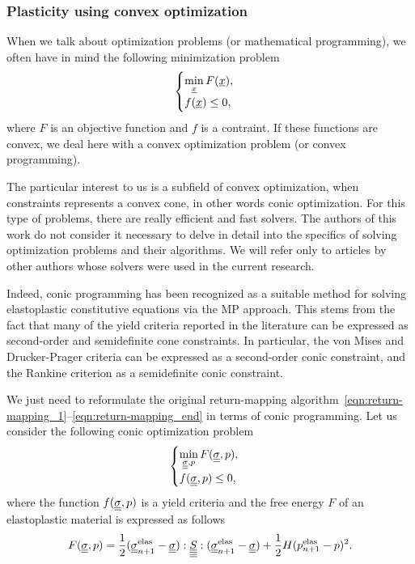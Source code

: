 \documentclass[12pt]{article}
\begin{document}
\subsubsection{Plasticity using convex optimization}

When we talk about optimization problems (or mathematical programming), we often have in mind the following minimization problem
\begin{equation}
    \begin{cases}
        \min\limits_{\underline{x}} F(\underline{x}),\\
        f(\underline{x}) \leq 0,
    \end{cases}
\end{equation}
where $F$ is an objective function and $f$ is a contraint. If these functions are convex, we deal here with a convex optimization problem (or convex programming). 

The particular interest to us is a subfield of convex optimization, when constraints represents a convex cone, in other words conic optimization. For this type of problems, there are really efficient and fast solvers. The authors of this work do not consider it necessary to delve in detail into the specifics of solving optimization problems and their algorithms. We will refer only to articles by other authors whose solvers were used in the current research.

Indeed, conic programming has been recognized as a suitable method for solving elastoplastic constitutive equations via the MP approach. This stems from the fact that many of the yield criteria reported in the literature can be expressed as second-order and semidefinite cone constraints. In particular, the von Mises and Drucker-Prager criteria can be expressed as a second-order conic constraint, and the Rankine criterion as a semidefinite conic constraint. 

We just need to reformulate the original return-mapping algorithm~\ref{eqn:return-mapping_1}--\ref{eqn:return-mapping_end} in terms of conic programming. Let us consider the following conic optimization problem
\begin{equation}
    \label{eqn:conic_problem}
    \begin{cases}
        \min\limits_{\underline{\underline{\sigma}}, p} F(\underline{\underline{\sigma}}, p), \\
        f(\underline{\underline{\sigma}}, p) \leq 0,
    \end{cases}
\end{equation}
where the function $f(\underline{\underline{\sigma}}, p)$ is a yield criteria and the free energy $F$ of an elastoplastic material is expressed as follows
\begin{equation}
    F(\underline{\underline{\sigma}}, p) = \frac{1}{2}(\underline{\underline{\sigma}}_{n+1}^{\text{elas}} - \underline{\underline{\sigma}}) : \underline{\underline{\underline{\underline{S}}}} : (\underline{\underline{\sigma}}_{n+1}^{\text{elas}} - \underline{\underline{\sigma}}) + \frac{1}{2}H(p_{n+1}^\text{elas} - p)^2.
\end{equation}
\end{document}
